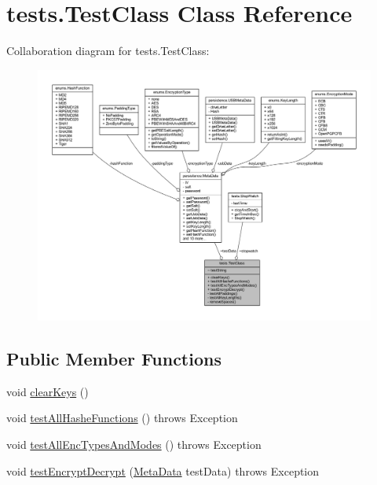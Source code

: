 \hypertarget{classtests_1_1_test_class}{}\section{tests.\+Test\+Class Class Reference}
\label{classtests_1_1_test_class}


Collaboration diagram for tests.\+Test\+Class\+:\nopagebreak
\begin{figure}[H]
\begin{center}
\leavevmode
\includegraphics[width=350pt]{classtests_1_1_test_class__coll__graph}
\end{center}
\end{figure}
\subsection*{Public Member Functions}
\begin{DoxyCompactItemize}
\item 
void \mbox{\hyperlink{classtests_1_1_test_class_a76d4a21196ec5031baa7c7a42be58cb5}{clear\+Keys}} ()
\item 
void \mbox{\hyperlink{classtests_1_1_test_class_a4f4c0d8502a8a3b322a44e20a5f9cdce}{test\+All\+Hashe\+Functions}} ()  throws Exception 	
\item 
void \mbox{\hyperlink{classtests_1_1_test_class_a85be535c071d279d8d7bc1a40201dcff}{test\+All\+Enc\+Types\+And\+Modes}} ()  throws Exception     
\item 
void \mbox{\hyperlink{classtests_1_1_test_class_a11145228e7254b6763247dcdb84d1805}{test\+Encrypt\+Decrypt}} (\mbox{\hyperlink{classpersistence_1_1_meta_data}{Meta\+Data}} test\+Data)  throws Exception     
\end{DoxyCompactItemize}
